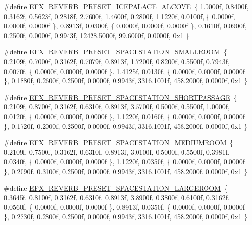 \begin{DoxyCompactItemize}
\item 
\#define \hyperlink{efx-presets_8h_ab735161bb3f91b845c66c6daacd30ef2}{E\+F\+X\+\_\+\+R\+E\+V\+E\+R\+B\+\_\+\+P\+R\+E\+S\+E\+T\+\_\+\+I\+C\+E\+P\+A\+L\+A\+C\+E\+\_\+\+A\+L\+C\+O\+VE}~\{ 1.\+0000f, 0.\+8400f, 0.\+3162f, 0.\+5623f, 0.\+2818f, 2.\+7600f, 1.\+4600f, 0.\+2800f, 1.\+1220f, 0.\+0100f, \{ 0.\+0000f, 0.\+0000f, 0.\+0000f \}, 0.\+8913f, 0.\+0300f, \{ 0.\+0000f, 0.\+0000f, 0.\+0000f \}, 0.\+1610f, 0.\+0900f, 0.\+2500f, 0.\+0000f, 0.\+9943f, 12428.\+5000f, 99.\+6000f, 0.\+0000f, 0x1 \}
\item 
\#define \hyperlink{efx-presets_8h_a93b3631fec62a41f9698ce61cab40c46}{E\+F\+X\+\_\+\+R\+E\+V\+E\+R\+B\+\_\+\+P\+R\+E\+S\+E\+T\+\_\+\+S\+P\+A\+C\+E\+S\+T\+A\+T\+I\+O\+N\+\_\+\+S\+M\+A\+L\+L\+R\+O\+OM}~\{ 0.\+2109f, 0.\+7000f, 0.\+3162f, 0.\+7079f, 0.\+8913f, 1.\+7200f, 0.\+8200f, 0.\+5500f, 0.\+7943f, 0.\+0070f, \{ 0.\+0000f, 0.\+0000f, 0.\+0000f \}, 1.\+4125f, 0.\+0130f, \{ 0.\+0000f, 0.\+0000f, 0.\+0000f \}, 0.\+1880f, 0.\+2600f, 0.\+2500f, 0.\+0000f, 0.\+9943f, 3316.\+1001f, 458.\+2000f, 0.\+0000f, 0x1 \}
\item 
\#define \hyperlink{efx-presets_8h_a6d8fba878e713dcc1f9823e5e4a8ec8d}{E\+F\+X\+\_\+\+R\+E\+V\+E\+R\+B\+\_\+\+P\+R\+E\+S\+E\+T\+\_\+\+S\+P\+A\+C\+E\+S\+T\+A\+T\+I\+O\+N\+\_\+\+S\+H\+O\+R\+T\+P\+A\+S\+S\+A\+GE}~\{ 0.\+2109f, 0.\+8700f, 0.\+3162f, 0.\+6310f, 0.\+8913f, 3.\+5700f, 0.\+5000f, 0.\+5500f, 1.\+0000f, 0.\+0120f, \{ 0.\+0000f, 0.\+0000f, 0.\+0000f \}, 1.\+1220f, 0.\+0160f, \{ 0.\+0000f, 0.\+0000f, 0.\+0000f \}, 0.\+1720f, 0.\+2000f, 0.\+2500f, 0.\+0000f, 0.\+9943f, 3316.\+1001f, 458.\+2000f, 0.\+0000f, 0x1 \}
\item 
\#define \hyperlink{efx-presets_8h_a2ca95e780372e4102f6439c01bbb4c47}{E\+F\+X\+\_\+\+R\+E\+V\+E\+R\+B\+\_\+\+P\+R\+E\+S\+E\+T\+\_\+\+S\+P\+A\+C\+E\+S\+T\+A\+T\+I\+O\+N\+\_\+\+M\+E\+D\+I\+U\+M\+R\+O\+OM}~\{ 0.\+2109f, 0.\+7500f, 0.\+3162f, 0.\+6310f, 0.\+8913f, 3.\+0100f, 0.\+5000f, 0.\+5500f, 0.\+3981f, 0.\+0340f, \{ 0.\+0000f, 0.\+0000f, 0.\+0000f \}, 1.\+1220f, 0.\+0350f, \{ 0.\+0000f, 0.\+0000f, 0.\+0000f \}, 0.\+2090f, 0.\+3100f, 0.\+2500f, 0.\+0000f, 0.\+9943f, 3316.\+1001f, 458.\+2000f, 0.\+0000f, 0x1 \}
\item 
\#define \hyperlink{efx-presets_8h_a2fc89101c08d137174083f3db35a890d}{E\+F\+X\+\_\+\+R\+E\+V\+E\+R\+B\+\_\+\+P\+R\+E\+S\+E\+T\+\_\+\+S\+P\+A\+C\+E\+S\+T\+A\+T\+I\+O\+N\+\_\+\+L\+A\+R\+G\+E\+R\+O\+OM}~\{ 0.\+3645f, 0.\+8100f, 0.\+3162f, 0.\+6310f, 0.\+8913f, 3.\+8900f, 0.\+3800f, 0.\+6100f, 0.\+3162f, 0.\+0560f, \{ 0.\+0000f, 0.\+0000f, 0.\+0000f \}, 0.\+8913f, 0.\+0350f, \{ 0.\+0000f, 0.\+0000f, 0.\+0000f \}, 0.\+2330f, 0.\+2800f, 0.\+2500f, 0.\+0000f, 0.\+9943f, 3316.\+1001f, 458.\+2000f, 0.\+0000f, 0x1 \}

\end{DoxyCompactItemize}
